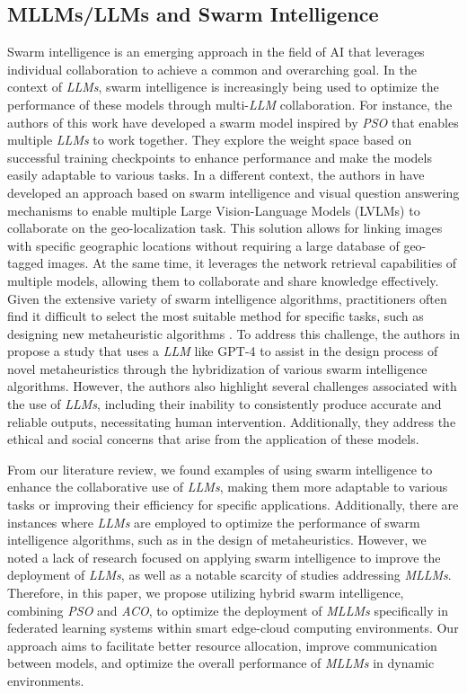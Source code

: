 \subsection{MLLMs/LLMs and Swarm Intelligence}
Swarm intelligence is an emerging approach in the field of AI that leverages individual collaboration to achieve a common and overarching goal. In the context of \textit{LLMs}, swarm intelligence is increasingly being used to optimize the performance of these models through multi-\textit{LLM} collaboration. For instance, the authors of this work \cite{feng2024model} have developed a swarm model inspired by \textit{PSO} that enables multiple \textit{LLMs} to work together. They explore the weight space based on successful training checkpoints to enhance performance and make the models easily adaptable to various tasks.
In a different context, the authors in \cite{han2024swarm} have developed an approach based on swarm intelligence and visual question answering mechanisms to enable multiple Large Vision-Language Models (LVLMs) to collaborate on the geo-localization task. This solution allows for linking images with specific geographic locations without requiring a large database of geo-tagged images. At the same time, it leverages the network retrieval capabilities of multiple models, allowing them to collaborate and share knowledge effectively.
Given the extensive variety of swarm intelligence algorithms, practitioners often find it difficult to select the most suitable method for specific tasks, such as designing new metaheuristic algorithms \cite{van2024llamea,pluhacek2023leveraging}. To address this challenge, the authors in \cite{pluhacek2023leveraging} propose a study that uses a \textit{LLM} like GPT-4 to assist in the design process of novel metaheuristics through the hybridization of various swarm intelligence algorithms. However, the authors also highlight several challenges associated with the use of \textit{LLMs}, including their inability to consistently produce accurate and reliable outputs, necessitating human intervention. Additionally, they address the ethical and social concerns that arise from the application of these models.

From our literature review, we found examples of using swarm intelligence to enhance the collaborative use of \textit{LLMs}, making them more adaptable to various tasks or improving their efficiency for specific applications. Additionally, there are instances where \textit{LLMs} are employed to optimize the performance of swarm intelligence algorithms, such as in the design of metaheuristics. However, we noted a lack of research focused on applying swarm intelligence to improve the deployment of \textit{LLMs}, as well as a notable scarcity of studies addressing \textit{MLLMs}. Therefore, in this paper, we propose utilizing hybrid swarm intelligence, combining \textit{PSO} and \textit{ACO}, to optimize the deployment of \textit{MLLMs} specifically in federated learning systems within smart edge-cloud computing environments. Our approach aims to facilitate better resource allocation, improve communication between models, and optimize the overall performance of \textit{MLLMs} in dynamic environments.